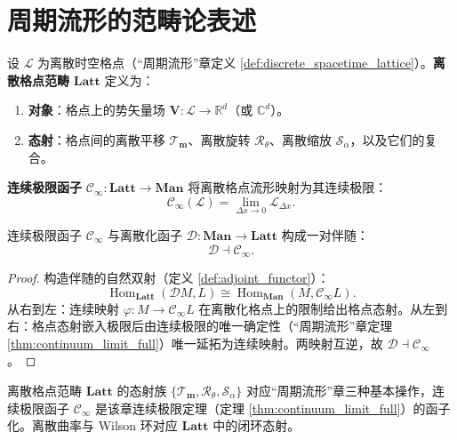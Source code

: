 \section{周期流形的范畴论表述}\label{sec:periodic_manifold_category}

\begin{definition}[离散格点范畴]\label{def:discrete_lattice_category}
设 $\mathcal{L}$ 为离散时空格点（“周期流形”章定义 \ref{def:discrete_spacetime_lattice}）。\textbf{离散格点范畴} $\mathbf{Latt}$ 定义为：
\begin{enumerate}[label=(\roman*)]
    \item \textbf{对象}：格点上的势矢量场 $\mathbf{V}: \mathcal{L} \to \mathbb{R}^d$（或 $\mathbb{C}^d$）。
    \item \textbf{态射}：格点间的离散平移 $\mathcal{T}_{\mathbf{m}}$、离散旋转 $\mathcal{R}_\theta$、离散缩放 $\mathcal{S}_\alpha$，以及它们的复合。
\end{enumerate}
\end{definition}

\begin{definition}[连续极限函子]\label{def:continuum_limit_functor}
\textbf{连续极限函子} $\mathcal{C}_{\infty}: \mathbf{Latt} \to \mathbf{Man}$ 将离散格点流形映射为其连续极限：
\[
\mathcal{C}_{\infty}(\mathcal{L}) = \lim_{\Delta x \to 0} \mathcal{L}_{\Delta x}.
\]
\end{definition}

\begin{proposition}[连续极限函子与伴随性]\label{prop:continuum_limit_adjunction}
连续极限函子 $\mathcal{C}_{\infty}$ 与离散化函子 $\mathcal{D}: \mathbf{Man} \to \mathbf{Latt}$ 构成一对伴随：
\[
\mathcal{D} \dashv \mathcal{C}_{\infty}.
\]
\end{proposition}

\begin{proof}
构造伴随的自然双射（定义 \ref{def:adjoint_functor}）：
\[
\operatorname{Hom}_{\mathbf{Latt}}(\mathcal{D}M, L) \cong \operatorname{Hom}_{\mathbf{Man}}(M, \mathcal{C}_{\infty}L).
\]
从右到左：连续映射 $\varphi: M \to \mathcal{C}_{\infty}L$ 在离散化格点上的限制给出格点态射。从左到右：格点态射嵌入极限后由连续极限的唯一确定性（“周期流形”章定理 \ref{thm:continuum_limit_full}）唯一延拓为连续映射。两映射互逆，故 $\mathcal{D} \dashv \mathcal{C}_{\infty}$。
\end{proof}

\begin{remark}\label{ch13_periodic_manifold_interface_remark}
离散格点范畴 $\mathbf{Latt}$ 的态射族 $\{\mathcal{T}_{\mathbf{m}}, \mathcal{R}_\theta, \mathcal{S}_\alpha\}$ 对应“周期流形”章三种基本操作，连续极限函子 $\mathcal{C}_{\infty}$ 是该章连续极限定理（定理 \ref{thm:continuum_limit_full}）的函子化。离散曲率与 Wilson 环对应 $\mathbf{Latt}$ 中的闭环态射。
\end{remark}

